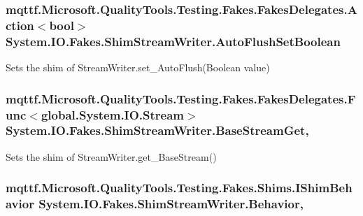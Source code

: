 \hypertarget{class_system_1_1_i_o_1_1_fakes_1_1_shim_stream_writer_abfad4353c768f7698301971f38a19ae0}{
\subsubsection[{Auto\-Flush\-Set\-Boolean}]{\setlength{\rightskip}{0pt plus 5cm}mqttf.\-Microsoft.\-Quality\-Tools.\-Testing.\-Fakes.\-Fakes\-Delegates.\-Action$<$bool$>$ System.\-I\-O.\-Fakes.\-Shim\-Stream\-Writer.\-Auto\-Flush\-Set\-Boolean\hspace{0.3cm}{\ttfamily [set]}}}\label{class_system_1_1_i_o_1_1_fakes_1_1_shim_stream_writer_abfad4353c768f7698301971f38a19ae0}


Sets the shim of Stream\-Writer.\-set\-\_\-\-Auto\-Flush(\-Boolean value)

\hypertarget{class_system_1_1_i_o_1_1_fakes_1_1_shim_stream_writer_a8a4f667581f1229d194ea435f17a70eb}{
\subsubsection[{Base\-Stream\-Get}]{\setlength{\rightskip}{0pt plus 5cm}mqttf.\-Microsoft.\-Quality\-Tools.\-Testing.\-Fakes.\-Fakes\-Delegates.\-Func$<$global.\-System.\-I\-O.\-Stream$>$ System.\-I\-O.\-Fakes.\-Shim\-Stream\-Writer.\-Base\-Stream\-Get\hspace{0.3cm}{\ttfamily [get]}, {\ttfamily [set]}}}\label{class_system_1_1_i_o_1_1_fakes_1_1_shim_stream_writer_a8a4f667581f1229d194ea435f17a70eb}


Sets the shim of Stream\-Writer.\-get\-\_\-\-Base\-Stream()

\hypertarget{class_system_1_1_i_o_1_1_fakes_1_1_shim_stream_writer_a829be75c09be4fc4f0edd653b30a78b8}{
\subsubsection[{Behavior}]{\setlength{\rightskip}{0pt plus 5cm}mqttf.\-Microsoft.\-Quality\-Tools.\-Testing.\-Fakes.\-Shims.\-I\-Shim\-Behavior System.\-I\-O.\-Fakes.\-Shim\-Stream\-Writer.\-Behavior\hspace{0.3cm}{\ttfamily [static]}, {\ttfamily [set]}}}\label{class_system_1_1_i_o_1_1_fakes_1_1_shim_stream_writer_a829be75c09be4fc4f0edd653b30a78b8}


